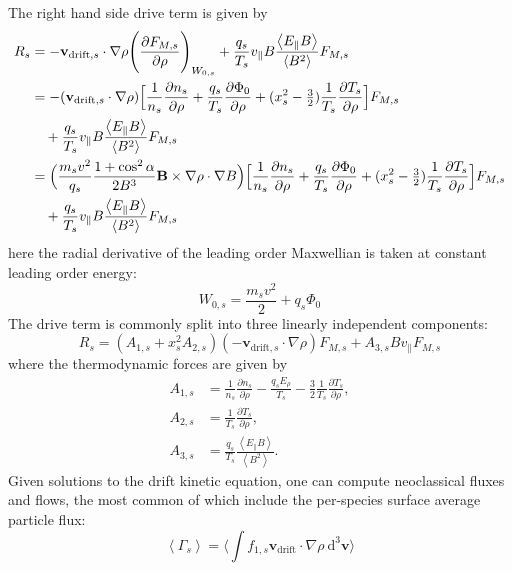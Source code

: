 \documentclass[11pt]{article}
\newcommand{\fsa}[1]{\left\langle #1 \right\rangle}
\begin{document}
The right hand side drive term is given by
\begin{align}
R_s &= -\mathbf{v}_{\mathrm{drift},s} \cdot \nabla \rho
\Bigg(\frac{\partial F_{M,s}}{\partial \rho} \Bigg)_{W_{0,s}}
+ \frac{q_s}{T_s}v_{\parallel}B \frac{\fsa{E_{\parallel}B}}{\fsa{B^2}}
F_{M,s} \\
&= - (\mathbf{v}_{\mathrm{drift},s} \cdot \nabla\rho)
\Big[\frac{1}{n_s}\frac{\partial n_s}{\partial \rho}
+ \frac{q_s}{T_s}\frac{\partial \Phi_0}{\partial \rho}
+ (x_s^2 - \tfrac{3}{2})\frac{1}{T_s}\frac{\partial T_s}{\partial \rho} \Big]
F_{M,s} \notag \\
&\quad + \frac{q_s}{T_s}v_{\parallel}B
\frac{\fsa{E_{\parallel}B}}{\fsa{B^2}} F_{M,s} \\
&= \Big(\frac{m_s v^2}{q_s} \frac{1 + \cos^2 \alpha}{2B^3}
\mathbf{B} \times \nabla \rho \cdot \nabla B \Big)
\Big[\frac{1}{n_s}\frac{\partial n_s}{\partial \rho}
+ \frac{q_s}{T_s}\frac{\partial \Phi_0}{\partial \rho}
+ (x_s^2 - \tfrac{3}{2})\frac{1}{T_s}\frac{\partial T_s}{\partial \rho} \Big]
F_{M,s} \notag \\
&\quad + \frac{q_s}{T_s}v_{\parallel}B
\frac{\fsa{E_{\parallel}B}}{\fsa{B^2}} F_{M,s}
\end{align}
here the radial derivative of the leading order Maxwellian is
taken at constant leading order energy:
\begin{equation}
W_{0,s} = \frac{m_s v^2}{2} + q_s \Phi_0
\end{equation}
The drive term is commonly split into three linearly independent components:
\begin{equation}
R_s = (A_{1,s} + x_s^2 A_{2,s}) (-\mathbf{v}_{\mathrm{drift},s} \cdot \nabla \rho) F_{M,s}
+ A_{3,s} Bv_{\parallel} F_{M,s}
\end{equation}
where the thermodynamic forces are given by
\begin{align}
A_{1,s} &= \frac{1}{n_s}\frac{\partial n_s}{\partial \rho}
- \frac{q_s E_\rho}{T_s}
- \frac{3}{2} \frac{1}{T_s} \frac{\partial T_s}{\partial \rho}, \\
A_{2,s} &= \frac{1}{T_s}\frac{\partial T_s}{\partial \rho}, \\
A_{3,s} &= \frac{q_s}{T_s} \frac{\fsa{E_\parallel B}}{\fsa{B^2}}.
\end{align}
Given solutions to the drift kinetic equation, one can compute neoclassical
fluxes and flows, the most common of which include the per-species surface
average particle flux:
\begin{equation}
\fsa{\Gamma_s} = \Bigg \langle \int f_{1,s}
\mathbf{v}_\mathrm{drift} \cdot \nabla \rho ~\mathrm{d}^3 \mathbf{v}
\Bigg \rangle
\end{equation}
\end{document}
